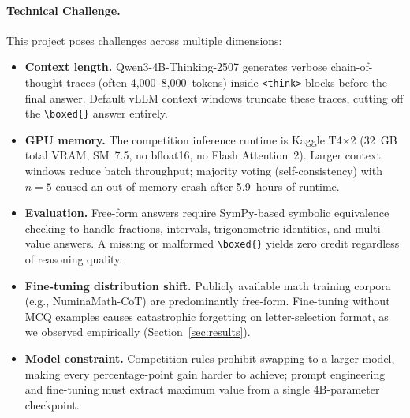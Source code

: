 \documentclass{article}
\begin{document}
\paragraph{Technical Challenge.}
This project poses challenges across multiple dimensions:
\begin{itemize}
  \item \textbf{Context length.} Qwen3-4B-Thinking-2507 generates verbose chain-of-thought traces (often 4,000--8,000~tokens) inside \verb|<think>| blocks before the final answer. Default vLLM context windows truncate these traces, cutting off the \verb|\boxed{}| answer entirely.
  \item \textbf{GPU memory.} The competition inference runtime is Kaggle T4$\times$2 (32~GB total VRAM, SM~7.5, no bfloat16, no Flash Attention~2). Larger context windows reduce batch throughput; majority voting (self-consistency) with $n{=}5$ caused an out-of-memory crash after 5.9~hours of runtime.
  \item \textbf{Evaluation.} Free-form answers require SymPy-based symbolic equivalence checking to handle fractions, intervals, trigonometric identities, and multi-value answers. A missing or malformed \verb|\boxed{}| yields zero credit regardless of reasoning quality.
  \item \textbf{Fine-tuning distribution shift.} Publicly available math training corpora (e.g., NuminaMath-CoT) are predominantly free-form. Fine-tuning without MCQ examples causes catastrophic forgetting on letter-selection format, as we observed empirically (Section~\ref{sec:results}).
  \item \textbf{Model constraint.} Competition rules prohibit swapping to a larger model, making every percentage-point gain harder to achieve; prompt engineering and fine-tuning must extract maximum value from a single 4B-parameter checkpoint.
\end{itemize}
\end{document}
